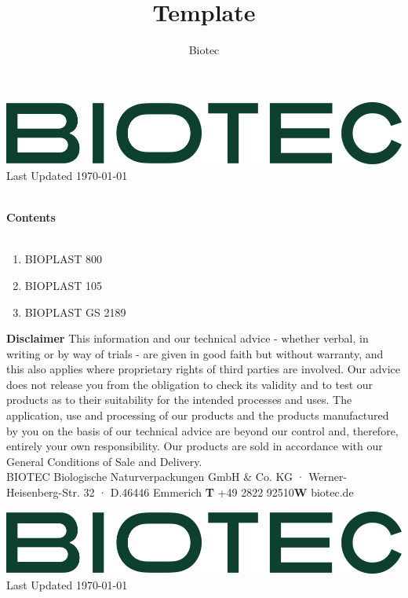 \documentclass{article}
\title{Template}
\author{Biotec}
\newcommand\setItemnumber[1]{\setcounter{enumi}{\numexpr#1-1\relax}}
\begin{document}
\begin{flushleft}
\includegraphics[scale=0.20]{biotec}
\hfill\tiny Last Updated \today
\end{flushleft}
\begin{flushleft}
\hspace{1cm}\\
\textbf{Contents}\\
\hspace{5in}\\
\begin{enumerate}
\setItemnumber{2}
\item BIOPLAST 800\\
\setItemnumber{3}
\item BIOPLAST 105\\
\setItemnumber{4}
\item BIOPLAST GS 2189\\

\end{enumerate}
\end{flushleft}
\vspace*{\fill}
{\footnotesize
    \textbf{Disclaimer} This information and our technical advice - whether verbal, in writing or by way of trials - are given in good faith but without warranty, and this also applies where proprietary rights of third parties are involved. Our advice does not release you from the obligation to check its validity and to test our products as to their suitability for the intended processes and uses. The application, use and processing of our products and the products manufactured by you on the basis of our technical advice are beyond our control and, therefore, entirely your own responsibility. Our products are sold in accordance with our General Conditions of Sale and Delivery.\\
 BIOTEC Biologische Naturverpackungen GmbH \& Co. KG · Werner-Heisenberg-Str. 32 · D.46446 Emmerich \hfill \textbf{T} +49 2822 92510\qquad \textbf{W} biotec.de}
\clearpage
\begin{flushleft}
\includegraphics[scale=0.20]{biotec}
\hfill\tiny Last Updated \today
\end{flushleft}
\end{document}
